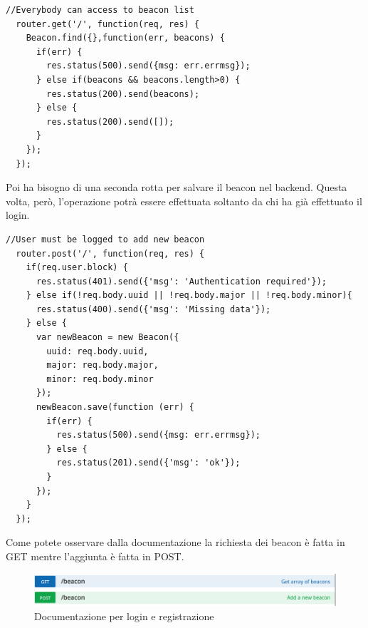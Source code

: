 \begin{lstlisting}[caption={/webserver/app/routes/beacon.js get}, style=javaScriptCode]
  //Everybody can access to beacon list
  router.get('/', function(req, res) {
    Beacon.find({},function(err, beacons) {
      if(err) {
        res.status(500).send({msg: err.errmsg});
      } else if(beacons && beacons.length>0) {
        res.status(200).send(beacons);
      } else {
        res.status(200).send([]);
      }
    });
  });
\end{lstlisting}
Poi ha bisogno di una seconda rotta per salvare il beacon nel backend.
Questa volta, però, l'operazione potrà essere effettuata soltanto da chi ha già effettuato il login.
\begin{lstlisting}[caption={/webserver/app/routes/beacon.js aggiunta}, style=javaScriptCode]
  //User must be logged to add new beacon
  router.post('/', function(req, res) {
    if(req.user.block) {
      res.status(401).send({'msg': 'Authentication required'});
    } else if(!req.body.uuid || !req.body.major || !req.body.minor){
      res.status(400).send({'msg': 'Missing data'});
    } else {
      var newBeacon = new Beacon({
        uuid: req.body.uuid,
        major: req.body.major,
        minor: req.body.minor
      });
      newBeacon.save(function (err) {
        if(err) {
          res.status(500).send({msg: err.errmsg});
        } else {
          res.status(201).send({'msg': 'ok'});
        }
      });
    }
  });
\end{lstlisting}

Come potete osservare dalla documentazione la richiesta dei beacon è fatta in GET mentre l'aggiunta è fatta in POST.

\begin{figure}[h]
\centering
\includegraphics[width=1\textwidth]{API/beacon_03.png} 
\caption{Documentazione per login e registrazione}
\label{fig:user:login}
\end{figure}

